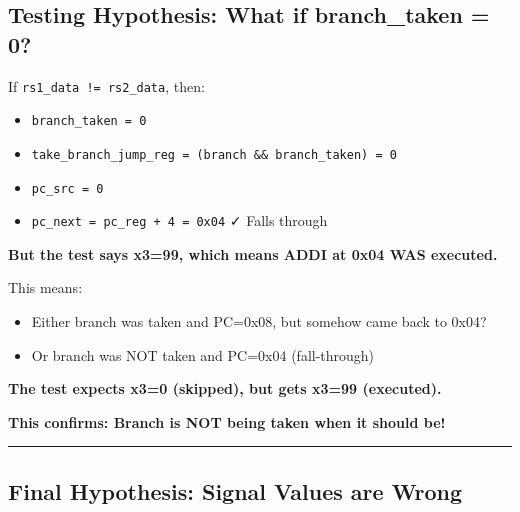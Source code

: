 \subsection{\texorpdfstring{Testing Hypothesis: What if
branch\_\allowbreak{}taken =
0?}{Testing Hypothesis: What if branch\_taken = 0?}}\label{cr:fix:timing-analysis:testing-hypothesis-what-if-branch-taken-0}

\begin{record}

If
\texttt{rs1\_\allowbreak{}data\ !=\allowbreak{}\ rs2\_\allowbreak{}data},
then:

\begin{itemize}
\tightlist
\item
  \texttt{branch\_\allowbreak{}taken\ =\allowbreak{}\ 0}
\item
  \texttt{take\_\allowbreak{}branch\_\allowbreak{}jump\_\allowbreak{}reg\ =\allowbreak{}\ (branch\ \&\&\ branch\_\allowbreak{}taken)\ =\allowbreak{}\ 0}
\item
  \texttt{pc\_\allowbreak{}src\ =\allowbreak{}\ 0}
\item
  \texttt{pc\_\allowbreak{}next\ =\allowbreak{}\ pc\_\allowbreak{}reg\ +\allowbreak{}\ 4\ =\allowbreak{}\ 0x04}
  ✓ Falls through
\end{itemize}

\textbf{But the test says x3=99, which means ADDI at 0x04 WAS executed.}

This means:

\begin{itemize}
\tightlist
\item
  Either branch was taken and PC=0x08, but somehow came back to 0x04?
\item
  Or branch was NOT taken and PC=0x04 (fall-through)
\end{itemize}

\textbf{The test expects x3=0 (skipped), but gets x3=99 (executed).}

\textbf{This confirms: Branch is NOT being taken when it should be!}

\begin{center}\rule{0.5\linewidth}{0.5pt}\end{center}

\end{record}

\subsection{\texorpdfstring{Final Hypothesis: Signal Values are Wrong
\ok{}}{Final Hypothesis: Signal Values are Wrong }}\label{cr:fix:timing-analysis:final-hypothesis-signal-values-are-wrong-dart}

